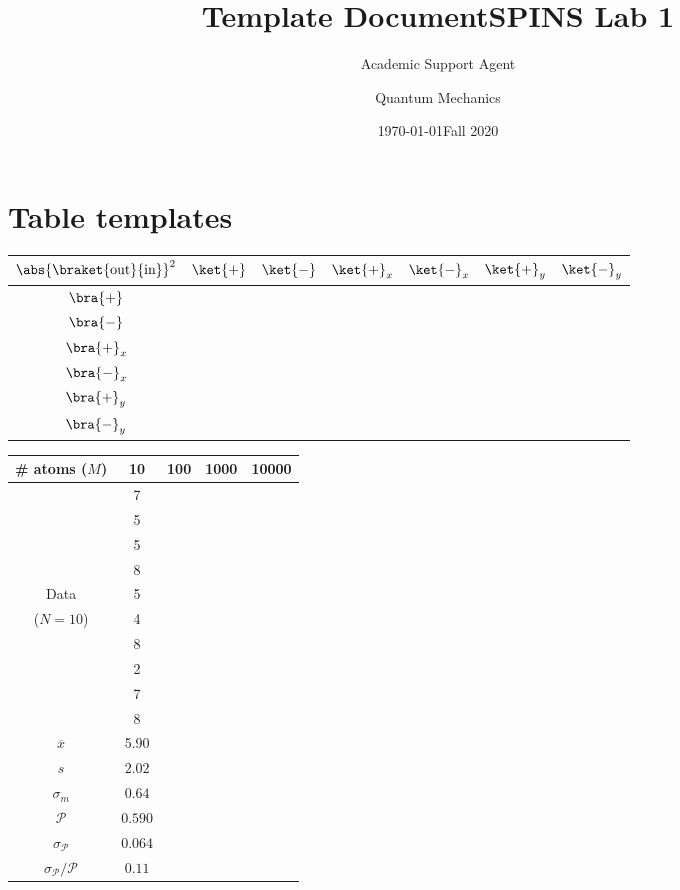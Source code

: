 \documentclass{article}
\title{Template Document}
\author{Academic Support Agent}
\date{\today}
\begin{document}
\maketitle

\title{SPINS Lab 1}
\author{Quantum Mechanics}
\date{Fall 2020}

\maketitle

\section*{Table templates}
\vspace{1in}
    
    \renewcommand{\arraystretch}{2}
	\begin{tabularx}{\textwidth}{|c|C{1}|C{1}|C{1}|C{1}|C{1}|C{1}|}
	    \hline
	    $\abs{\braket{\text{out}}{\text{in}}}^2$ & $\ket{+}$ & $\ket{-}$ & $\ket{+}_x$ & $\ket{-}_x$ & $\ket{+}_y$ & $\ket{-}_y$ \\ \hline
	    $\bra{+}$ &&&&&& \\ \hline
	    $\bra{-}$ &&&&&& \\ \hline
	    $\bra{+}_x$ &&&&&& \\ \hline
	    $\bra{-}_x$ &&&&&& \\ \hline
	    $\bra{+}_y$ &&&&&& \\ \hline
	    $\bra{-}_y$ &&&&&& \\ \hline
	\end{tabularx}
	
		\renewcommand{\arraystretch}{1.7}
		\begin{tabularx}{\textwidth}{|c|C{1}|C{1}|C{1}|C{1}|}
		    \hline
		    \# atoms ($M$)	& 10	& 100	& 1000	& 10000 \\ \hline
	        & 7 &&& \\ 
	        & 5 &&& \\ 
	        & 5 &&& \\ 
	        & 8 &&& \\ 
	        Data & 5 &&& \\ 
	        ($N=10$) & 4 &&& \\ 
	        & 8 &&& \\ 
	        & 2 &&& \\ 
	        & 7 &&& \\ 
	        & 8 &&& \\ \hline
	        $\overline{x}$ & 5.90 &&& \\ \hline
	        $s$ & $2.02$ &&& \\ \hline
	        $\sigma_m$ & $0.64$ &&& \\ \hline
	        $\mathcal{P}$ & $0.590$ &&& \\ \hline
	        $\sigma_\mathcal{P}$ & $0.064$ &&& \\ \hline
	        $\sigma_\mathcal{P}/\mathcal{P}$ & $0.11$ &&& \\ \hline
		\end{tabularx}
	
	\newpage
\end{document}
